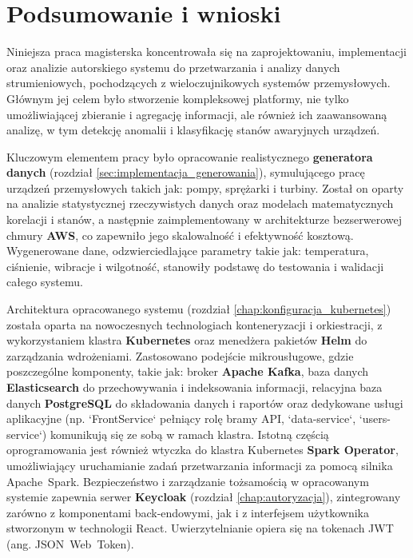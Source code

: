 \section{Podsumowanie i wnioski}
\label{sec:podsumowanie_wnioski}

Niniejsza praca magisterska koncentrowała się na zaprojektowaniu, implementacji oraz analizie autorskiego systemu do przetwarzania i analizy danych strumieniowych, pochodzących z wieloczujnikowych systemów przemysłowych. Głównym jej celem było stworzenie kompleksowej platformy, nie tylko umożliwiającej zbieranie i agregację informacji, ale również ich zaawansowaną analizę, w tym detekcję anomalii i klasyfikację stanów awaryjnych urządzeń.

Kluczowym elementem pracy było opracowanie realistycznego \textbf{generatora danych} (rozdział \ref{sec:implementacja_generowania}), symulującego pracę urządzeń przemysłowych takich jak: pompy, sprężarki i turbiny. Został on oparty na analizie statystycznej rzeczywistych danych oraz modelach matematycznych korelacji i stanów, a następnie zaimplementowany w architekturze bezserwerowej chmury \textbf{AWS}, co zapewniło jego skalowalność i efektywność kosztową. Wygenerowane dane, odzwierciedlające parametry takie jak: temperatura, ciśnienie, wibracje i wilgotność, stanowiły podstawę do testowania i walidacji całego systemu.

Architektura opracowanego systemu (rozdział \ref{chap:konfiguracja_kubernetes}) została oparta na nowoczesnych technologiach konteneryzacji i orkiestracji, z wykorzystaniem klastra \textbf{Kubernetes} oraz menedżera pakietów \textbf{Helm} do zarządzania wdrożeniami. Zastosowano podejście mikrousługowe, gdzie poszczególne komponenty, takie jak: broker \textbf{Apache Kafka}, baza danych \textbf{Elasticsearch} do przechowywania i indeksowania informacji, relacyjna baza danych \textbf{PostgreSQL} do składowania danych i raportów oraz dedykowane usługi aplikacyjne (np. `FrontService` pełniący rolę bramy API, `data-service`, `users-service`) komunikują się ze sobą w ramach klastra. Istotną częścią oprogramowania jest również wtyczka do klastra Kubernetes \textbf{Spark Operator}, umożliwiający uruchamianie zadań przetwarzania informacji za pomocą silnika \mbox{Apache Spark}. Bezpieczeństwo i zarządzanie tożsamością w opracowanym systemie zapewnia serwer \textbf{Keycloak} (rozdział \ref{chap:autoryzacja}), zintegrowany zarówno z komponentami back-endowymi, jak i z interfejsem użytkownika stworzonym w technologii React. Uwierzytelnianie opiera się na tokenach JWT (ang. \mbox{JSON Web Token}).

